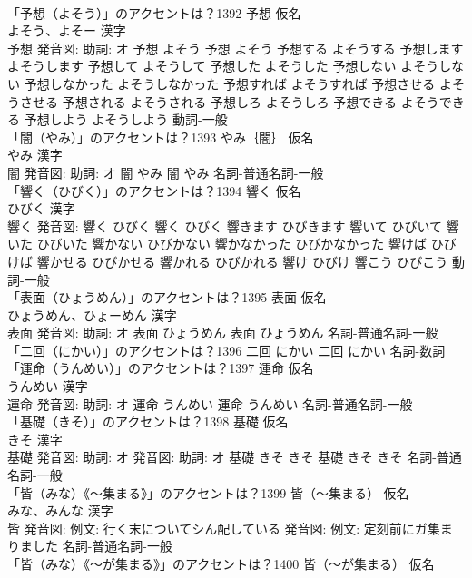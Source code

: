 \documentclass[8pt]{extreport}
\begin{document}
\begin{CJK}{UTF8}{min}
\\	「予想（よそう）」のアクセントは？1392	予想 仮名　
\\	よそう、よそー 漢字　
\\	予想 発音図: 助詞: オ	予想 よそう		予想 よそう 予想する よそうする 予想します よそうします 予想して よそうして 予想した よそうした 予想しない よそうしない 予想しなかった よそうしなかった 予想すれば よそうすれば 予想させる よそうさせる 予想される よそうされる 予想しろ よそうしろ 予想できる よそうできる 予想しよう よそうしよう				動詞-一般 
\\	「闇（やみ）」のアクセントは？1393	やみ｛闇｝ 仮名　
\\	やみ 漢字　
\\	闇 発音図: 助詞: オ	闇 やみ		闇 やみ				名詞-普通名詞-一般 
\\	「響く（ひびく）」のアクセントは？1394	響く 仮名　
\\	ひびく 漢字　
\\	響く 発音図:	響く ひびく		響く ひびく 響きます ひびきます 響いて ひびいて 響いた ひびいた 響かない ひびかない 響かなかった ひびかなかった 響けば ひびけば 響かせる ひびかせる 響かれる ひびかれる 響け ひびけ 響こう ひびこう				動詞-一般 
\\	「表面（ひょうめん）」のアクセントは？1395	表面 仮名　
\\	ひょうめん、ひょーめん 漢字　
\\	表面 発音図: 助詞: オ	表面 ひょうめん		表面 ひょうめん				名詞-普通名詞-一般 
\\	「二回（にかい）」のアクセントは？1396		二回 にかい		二回 にかい				名詞-数詞 
\\	「運命（うんめい）」のアクセントは？1397	運命 仮名　
\\	うんめい 漢字　
\\	運命 発音図: 助詞: オ	運命 うんめい		運命 うんめい				名詞-普通名詞-一般 
\\	「基礎（きそ）」のアクセントは？1398	基礎 仮名　
\\	きそ 漢字　
\\	基礎 発音図: 助詞: オ 発音図: 助詞: オ	基礎 きそ きそ		基礎 きそ きそ				名詞-普通名詞-一般 
\\	「皆（みな）《〜集まる》」のアクセントは？1399	皆（〜集まる） 仮名　
\\	みな、みんな 漢字　
\\	皆 発音図: 例文: 行く末についてシん配している 発音図: 例文: 定刻前にガ集まりました							名詞-普通名詞-一般 
\\	「皆（みな）《〜が集まる》」のアクセントは？1400	皆（〜が集まる） 仮名　

\end{CJK}
\end{document}
